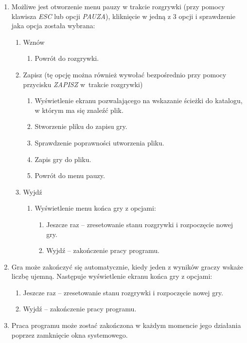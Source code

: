 \documentclass[a4paper]{article}
\begin{document}
\begin{enumerate}
    \item Możliwe jest otworzenie menu pauzy w trakcie rozgrywki (przy pomocy klawisza \textit{ESC} lub opcji \textit{PAUZA}), kliknięcie w jedną z 3 opcji i sprawdzenie jaka opcja została wybrana:\label{pauza}
    \begin{enumerate}
            \item Wznów
            \begin{enumerate}
                \item Powrót do rozgrywki.
            \end{enumerate}
            \item Zapisz (tę opcję można również wywołać bezpośrednio przy pomocy przycisku \textit{ZAPISZ} w~trakcie rozgrywki)
            \begin{enumerate}
                \item Wyświetlenie ekranu pozwalającego na wskazanie ścieżki do katalogu, w którym ma się znaleźć plik.
                \item Stworzenie pliku do zapisu gry.
                \item Sprawdzenie poprawności utworzenia pliku.
                \item Zapis gry do pliku.
                \item Powrót do menu pauzy.
            \end{enumerate}
            \item Wyjdź
            \begin{enumerate}
                \item Wyświetlenie menu końca gry z opcjami:
                \begin{enumerate}
					\item Jeszcze raz -- zresetowanie stanu rozgrywki i rozpoczęcie nowej gry.
					\item Wyjdź -- zakończenie pracy programu.
				\end{enumerate}
            \end{enumerate}
    \end{enumerate}
    \item Gra może zakończyć się automatycznie, kiedy jeden z wyników graczy wskaże liczbę ujemną. Następuje wyświetlenie ekranu końca gry z opcjami:
    \begin{enumerate}
        \item Jeszcze raz -- zresetowanie stanu rozgrywki i rozpoczęcie nowej gry.
        \item Wyjdź -- zakończenie pracy programu.
    \end{enumerate}
    \item Praca programu może zostać zakończona w każdym momencie jego działania poprzez zamknięcie okna systemowego.
\end{enumerate}
\end{document}
